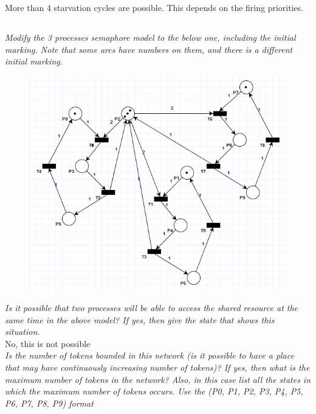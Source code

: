 \documentclass[letterpaper]{article}
\begin{document}
More than 4 starvation cycles are possible.
This depends on the firing priorities.




\subsection{}
\textit{Modify the 3 processes semaphore model to the below one, including the initial marking.
 Note that some arcs have numbers on them, and there is a different initial marking.
}

\begin{figure}[H]
 \centering
 \includegraphics[width=\textwidth]{image5.png}
\end{figure}

\textit{Is it possible that two processes will be able to access the shared resource at the same time in the above model? If yes, then give the state that shows this situation.}\\


No, this is not possible\\

\textit{Is the number of tokens bounded in this network (is it possible to have a place that may have continuously increasing number of tokens)? If yes, then what is the maximum number of tokens in the network? Also, in this case list all the states in which the maximum number of tokens occurs.
 Use the (P0, P1, P2, P3, P4, P5, P6, P7, P8, P9) format
}\\
\end{document}
